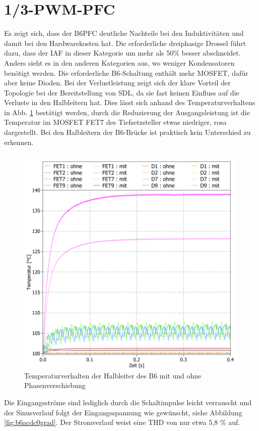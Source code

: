 \section{1/3-PWM-PFC}
	Es zeigt sich, dass der \gls{B6PFC} deutliche Nachteile bei den Induktivitäten und damit bei den Hardwarekosten hat. Die erforderliche dreiphasige Drossel führt dazu, dass der IAF in dieser Kategorie um mehr als 50\% besser abschneidet.
	Anders sieht es in den anderen Kategorien aus, wo weniger Kondensatoren benötigt werden. Die erforderliche B6-Schaltung enthält mehr \gls{MOSFET}, dafür aber keine Dioden. Bei der Verlustleistung zeigt sich der klare Vorteil der Topologie bei der Bereitstellung von \gls{SDL}, da sie fast keinen Einfluss auf die Verluste in den Halbleitern hat. Dies lässt sich anhand des Temperaturverhaltens in Abb. \ref{fig:b6temp030grad} bestätigt werden, durch die Reduzierung der Ausgangsleistung ist die Temperatur im  \gls{MOSFET} FET7 des Tiefsetzsteller etwas niedriger, rosa dargestellt. Bei den Halbleitern der B6-Brücke ist praktisch kein Unterschied zu erkennen.
	\begin{figure}
		\centering
		\includegraphics[width=1\linewidth]{content/Grafiken/B6_Temp_0&30Grad}
		\caption{Temperaturverhalten der Halbleiter des B6 mit und ohne Phasenverschiebung}
		\label{fig:b6temp030grad}
	\end{figure}
	Die Eingangsströme sind lediglich durch die Schaltimpulse leicht verrauscht und der Sinusverlauf folgt der Eingangsspannung wie gewünscht, siehe Abbildung \ref{fig:b6acdc0grad}.  Der Stromverlauf weist eine THD von nur etwa 5,8 \% auf. 
	
